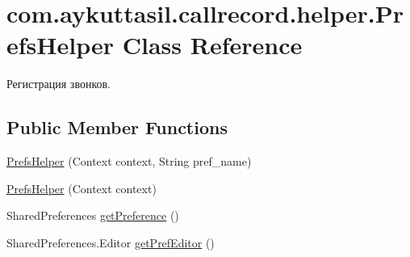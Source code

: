 \hypertarget{classcom_1_1aykuttasil_1_1callrecord_1_1helper_1_1_prefs_helper}{}\section{com.\+aykuttasil.\+callrecord.\+helper.\+Prefs\+Helper Class Reference}
\label{classcom_1_1aykuttasil_1_1callrecord_1_1helper_1_1_prefs_helper}


Регистрация звонков.  


\subsection*{Public Member Functions}
\begin{DoxyCompactItemize}
\item 
\hyperlink{classcom_1_1aykuttasil_1_1callrecord_1_1helper_1_1_prefs_helper_ab49562720e21438e0e886cbcdf955d50}{Prefs\+Helper} (Context context, String pref\+\_\+name)
\item 
\hyperlink{classcom_1_1aykuttasil_1_1callrecord_1_1helper_1_1_prefs_helper_af2af1e665783a6b36b6668899e64d4c5}{Prefs\+Helper} (Context context)
\item 
Shared\+Preferences \hyperlink{classcom_1_1aykuttasil_1_1callrecord_1_1helper_1_1_prefs_helper_ad14e4ad705aa0f59f69c9365cbfab004}{get\+Preference} ()
\item 
Shared\+Preferences.\+Editor \hyperlink{classcom_1_1aykuttasil_1_1callrecord_1_1helper_1_1_prefs_helper_a909e1c90c5a4972cdca679b39bb1badb}{get\+Pref\+Editor} ()
\end{DoxyCompactItemize}

